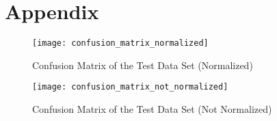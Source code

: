 \documentclass[fleqn,10pt]{SelfArx} %
\begin{document}
\section{Appendix}

\begin{figure*}[ht]\centering %
	\texttt{[image: confusion\_matrix\_normalized]}
	\caption{Confusion Matrix of the Test Data Set (Normalized)}
	\label{fig:view}
\end{figure*}

\begin{figure*}[ht]\centering %
	\texttt{[image: confusion\_matrix\_not\_normalized]}
	\caption{Confusion Matrix of the Test Data Set (Not Normalized)}
	\label{fig:view}
\end{figure*}
\end{document}
